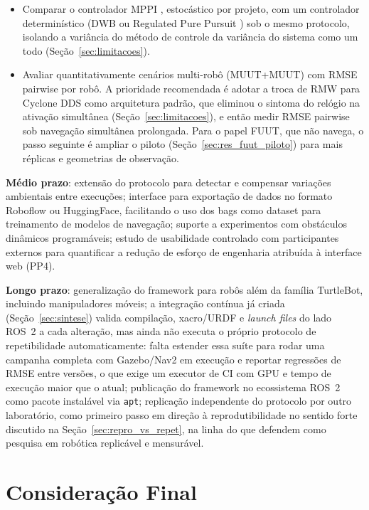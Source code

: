 \begin{itemize}
    \item Comparar o controlador MPPI \cite{williams2016}, estocástico por
    projeto, com um controlador determinístico (DWB \cite{fox1997} ou
    Regulated Pure Pursuit \cite{macenski2023survey}) sob o mesmo protocolo,
    isolando a variância do método de controle da variância do sistema como
    um todo (Seção~\ref{sec:limitacoes}).

    \item Avaliar quantitativamente cenários multi-robô (MUUT+MUUT) com RMSE
    pairwise por robô. A prioridade recomendada é adotar a troca de RMW para
    Cyclone DDS como arquitetura padrão, que eliminou o sintoma do relógio na
    ativação simultânea (Seção~\ref{sec:limitacoes}), e então medir RMSE
    pairwise sob navegação simultânea prolongada. Para o papel FUUT, que não
    navega, o passo seguinte é ampliar o piloto
    (Seção~\ref{sec:res_fuut_piloto}) para mais réplicas e geometrias de
    observação.

\end{itemize}

\textbf{Médio prazo}: extensão do protocolo para detectar e compensar variações
ambientais entre execuções; interface para exportação de dados no formato Roboflow
ou HuggingFace, facilitando o uso dos bags como dataset para treinamento de modelos
de navegação; suporte a experimentos com obstáculos dinâmicos programáveis; estudo
de usabilidade controlado com participantes externos para quantificar a redução de
esforço de engenharia atribuída à interface web (PP4).

\textbf{Longo prazo}: generalização do framework para robôs além da família
TurtleBot, incluindo manipuladores móveis; a integração contínua já criada
(Seção~\ref{sec:sintese}) valida compilação, xacro/URDF e \textit{launch files}
do lado ROS~2 a cada alteração, mas ainda não executa o próprio protocolo de
repetibilidade automaticamente: falta estender essa suíte para rodar uma
campanha completa com Gazebo/Nav2 em execução e reportar regressões de RMSE
entre versões, o que exige um executor de CI com GPU e tempo de execução maior
que o atual; publicação do framework no ecossistema ROS~2 como pacote
instalável via \texttt{apt}; replicação independente do protocolo por outro
laboratório, como primeiro passo em direção à reprodutibilidade no sentido
forte discutido na Seção~\ref{sec:repro_vs_repet}, na linha do que
 defendem como pesquisa em robótica replicável e
mensurável.

\section{Consideração Final}
\label{sec:final}

